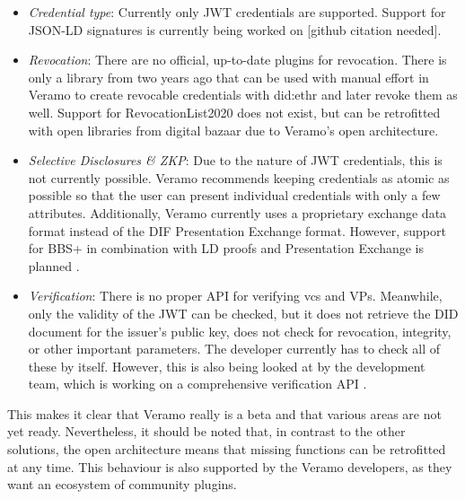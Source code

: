 \begin{itemize}
    \item \textit{Credential type}: Currently only JWT credentials are supported. Support for JSON-LD signatures is currently being worked on [github citation needed].
    \item \textit{Revocation}: There are no official, up-to-date plugins for revocation. There is only a library from two years ago that can be used with manual effort in Veramo to create revocable credentials with did:ethr and later revoke them as well. Support for RevocationList2020 does not exist, but can be retrofitted with open libraries from digital bazaar due to Veramo's open architecture.
    \item \textit{Selective Disclosures \& ZKP}: Due to the nature of JWT credentials, this is not currently possible. Veramo recommends keeping credentials as atomic as possible so that the user can present individual credentials with only a few attributes. Additionally, Veramo currently uses a proprietary exchange data format instead of the DIF Presentation Exchange format. However, support for BBS+ in combination with LD proofs and Presentation Exchange is planned \cite{terbu_tracking_2021}.
    \item \textit{Verification}: There is no proper API for verifying \acp{vc} and \acp{VP}. Meanwhile, only the validity of the JWT can be checked, but it does not retrieve the \ac{DID} document for the issuer's public key, does not check for revocation, integrity, or other important parameters. The developer currently has to check all of these by itself. However, this is also being looked at by the development team, which is working on a comprehensive verification API \cite{riedel_generalized_2021}.
\end{itemize}

    This makes it clear that Veramo really is a beta and that various areas are not yet ready. Nevertheless, it should be noted that, in contrast to the other solutions, the open architecture means that missing functions can be retrofitted at any time. This behaviour is also supported by the Veramo developers, as they want an ecosystem of community plugins.
    
